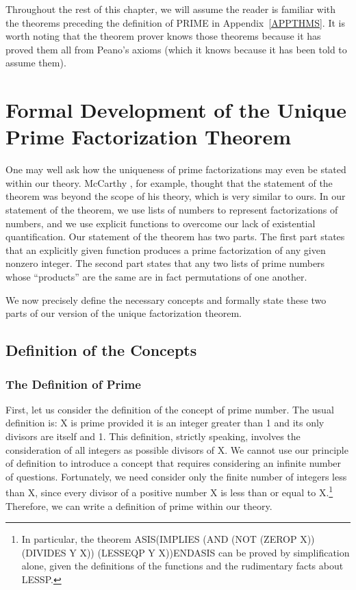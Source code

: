 \documentclass[11pt]{book}
\newcommand{\pubdefaulttextsize}{\large}
\begin{document}
Throughout the rest of this
chapter, we will assume the reader is familiar with
the theorems preceding the definition of PRIME in Appendix~\ref{APPTHMS}.
It is worth noting that the theorem prover knows those theorems
because it has proved them all from Peano's axioms
(which it knows because it has been told to assume them).
\section{Formal Development of the Unique Prime Factorization Theorem}
\pubdefaulttextsize
One may well ask how the 
uniqueness of prime factorizations may even be stated  within our theory.
McCarthy \cite{MCCARTHYBASIS}, for example,  thought that the
statement of the theorem was beyond the scope of his theory,
which is very similar to ours.  In our statement of the theorem,
we use lists of numbers to represent  factorizations of
numbers, and we  use explicit functions to overcome our 
lack of existential quantification.  Our statement of the       
theorem has  two parts.   The first  part states
that an explicitly given function  produces a prime factorization of any given nonzero
integer.    The second  part states that
any two lists of prime numbers whose ``products''
are the same are in fact  permutations of one
another.                        

We  now  precisely define the necessary concepts and
formally state these two parts of our version of the unique factorization
theorem.
\subsection{Definition of the Concepts}
\pubdefaulttextsize
\subsubsection{The Definition of Prime}
\pubdefaulttextsize
First, let us consider the definition of the
concept of prime number.
The usual definition is:  X is prime provided it is an integer greater than 1 and its
only divisors are itself and 1.  This definition,
strictly speaking, involves the consideration of
all integers as possible divisors of X.
We cannot use
our principle of definition to introduce a concept that requires
considering  an infinite number of questions.  
Fortunately, we  need   consider only the finite        
number of integers less than X, since every divisor of a positive
number X is
less than or equal to X.\footnote{In particular, the theorem {ASIS}(IMPLIES (AND (NOT (ZEROP X)) (DIVIDES Y X)) (LESSEQP Y X)){ENDASIS} can be proved by simplification alone, given the definitions of the functions and the rudimentary facts about LESSP.}
Therefore, we can write
a definition of prime within our theory.
\end{document}

